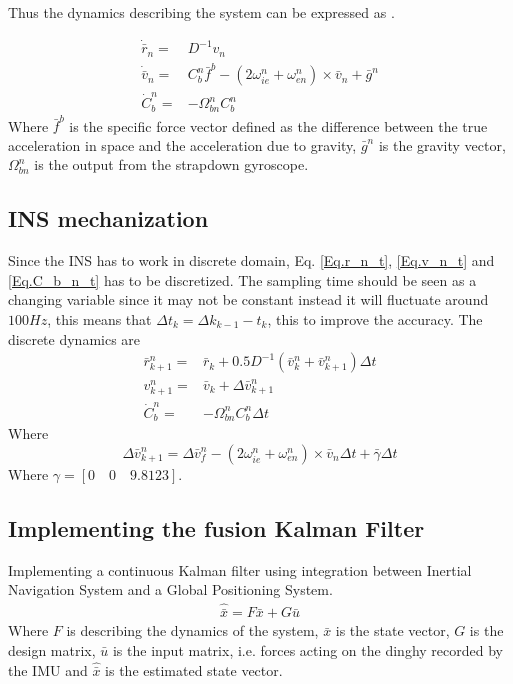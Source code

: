 Thus the dynamics describing the system can be expressed as \cite{nonlinear}.

\begin{align}
\dot{\bar{r}}_n = & D^{-1}v_n
\label{Eq.r_n_t}\\
\dot{\bar{v}}_n = & C_b^n \bar{f}^b-(2\omega_{ie}^n+\omega_{en}^n) \times \bar{v}_n +\bar{g}^n
\label{Eq.v_n_t}\\
\dot{C}_b^n = & -\Omega_{bn}^n C_b^n 
\label{Eq.C_b_n_t}
\end{align}
Where $\bar{f}^b$ is the specific force vector defined as the difference between the true acceleration in
space and the acceleration due to gravity, $\bar{g}^n$ is the gravity vector, $\Omega_{bn}^n$ is the output from the strapdown gyroscope.


\subsection*{INS mechanization}
Since the INS has to work in discrete domain, Eq. \eqref{Eq.r_n_t}, \eqref{Eq.v_n_t} and \eqref{Eq.C_b_n_t} has to be discretized. The sampling time should be seen as a changing variable since it may not be constant instead it will fluctuate around $100Hz$, this means that $\Delta t_k = \Delta k_{k-1} - t_{k}$, this to improve the accuracy. The discrete dynamics are
\begin{align}
\bar{r}_{k+1}^n = & \bar{r}_k + 0.5D^{-1}(\bar{v}_k^n + \bar{v}_{k+1}^n)\Delta t
\label{Eq.r_n_t}\\
v_{k+1}^n= & \bar{v}_k + \Delta \bar{v}_{k+1}^n
\label{Eq.v_n_t}\\
\dot{C}_b^n = & -\Omega_{bn}^n C_b^n \Delta t
\label{Eq.C_b_n_t}
\end{align}
Where 
\begin{equation}
\Delta \bar{v}_{k+1}^n = \Delta \bar{v}_f^n - (2\omega_{ie}^n+\omega_{en}^n) \times \bar{v}_n \Delta t +\bar{\gamma}\Delta t
\end{equation}
Where $\gamma = [0 \quad 0 \quad 9.8123]$.

\subsection*{Implementing the fusion Kalman Filter}
Implementing a continuous Kalman filter using integration between Inertial Navigation System and a Global Positioning System.
\begin{align}
\hat{\bar{x}} = F \bar{x} + G \bar{u}
\label{eq.state_1}
\end{align}
Where $F$ is describing the dynamics of the system, $\bar{x}$ is the state vector, $G$ is the design matrix, $\bar{u}$ is the input matrix, i.e. forces acting on the dinghy recorded by the IMU and $\hat{\bar{x}}$ is the estimated state vector. \\

